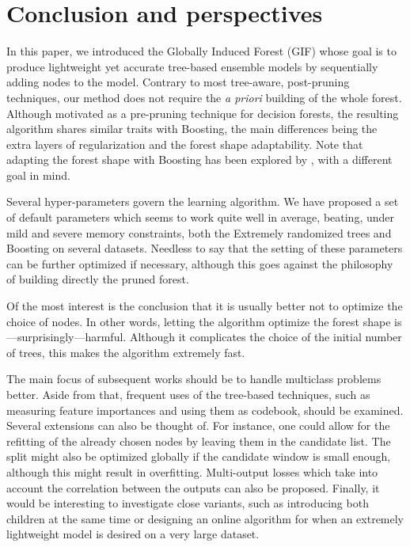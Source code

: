 \documentclass{article}
\begin{document}

\section{Conclusion and perspectives}
\label{sec:conclusion}

In this paper, we introduced the Globally Induced Forest (GIF) whose goal is to
produce lightweight yet accurate tree-based ensemble models by sequentially
adding nodes to the model. Contrary to most tree-aware, post-pruning techniques,
our method does not require the {\it a priori} building of the whole
forest. Although motivated as a pre-pruning technique for decision forests, the
resulting algorithm shares similar traits with Boosting, the main differences
being the extra layers of regularization and the forest shape adaptability. Note
that adapting the forest shape with Boosting has been explored by
\citet{johnson2014regforest}, with a different goal in mind.

Several hyper-parameters govern the learning algorithm. We have proposed a set
of default parameters which seems to work quite well in average, beating, under
mild and severe memory constraints, both the Extremely randomized trees and
Boosting on several datasets. Needless to say that the setting of these
parameters can be further optimized if necessary, although this goes against the
philosophy of building directly the pruned forest.

Of the most interest is the conclusion that it is usually better not to optimize
the choice of nodes. In other words, letting the algorithm optimize the forest
shape is---surprisingly---harmful. Although it complicates the choice of the
initial number of trees, this makes the algorithm extremely fast.

The main focus of subsequent works should be to handle multiclass problems
better. Aside from that, frequent uses of the tree-based techniques, such as
measuring feature importances and using them as codebook, should be examined.
Several extensions can also be thought of. For instance, one could allow for the
refitting of the already chosen nodes by leaving them in the candidate list. The
split might also be optimized globally if the candidate window is small enough,
although this might result in overfitting. Multi-output losses which take into
account the correlation between the outputs can also be proposed.  Finally, it 
would be interesting to investigate close variants, such as introducing both 
children at the same time or designing an online algorithm for when an
extremely lightweight model is desired on a very large dataset.
\end{document}
